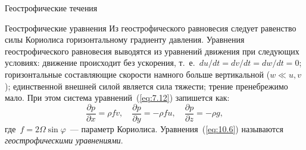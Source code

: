 \begin{chapter}{Геострофические течения}
\begin{section}{Геострофические уравнения}
Из геострофического равновесия 
следует равенство силы Кориолиса
горизонтальному градиенту давления. Уравнения геострофического равновесия
выводятся из уравнений движения при следующих условиях: движение
происходит без ускорения, т.~е.~$du/dt = dv/dt = dw/dt = 0$; горизонтальные
составляющие скорости намного больше вертикальной ($w \ll u,v$);
единственной внешней силой является сила тяжести; трение пренебрежимо
мало. При этом система уравнений~(\ref{eq:7.12}) запишется как:
\begin{equation}\label{eq:10.6}
 \frac{\partial p}{\partial x}= \rho fv, \quad
 \frac{\partial p}{\partial y}= - \rho f u, \quad
 \frac{\partial p}{\partial z}= - \rho g,
\end{equation}
где~$f = 2 \Omega \sin \varphi$~--- параметр Кориолиса. 
Уравнения~(\ref{eq:10.6}) называются 
\emph{геострофическими уравнениями}.
%


\end{section}
\end{chapter}
